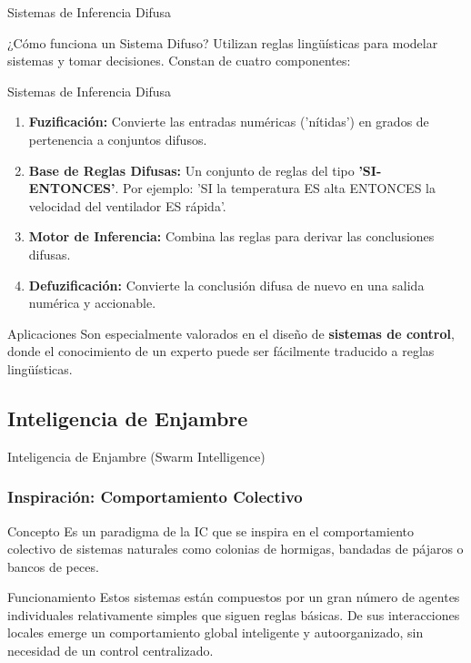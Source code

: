 \documentclass[aspectratio=169,xcolor=dvipsnames]{beamer}
\begin{document}
\begin{frame}{Sistemas de Inferencia Difusa}
    \begin{block}{¿Cómo funciona un Sistema Difuso?}
    Utilizan reglas lingüísticas para modelar sistemas y tomar decisiones. Constan de cuatro componentes:
    \end{block}
\end{frame}
\begin{frame}{Sistemas de Inferencia Difusa}
    \begin{enumerate}
        \item \textbf{Fuzificación:} Convierte las entradas numéricas ('nítidas') en grados de pertenencia a conjuntos difusos. \pause
        \item \textbf{Base de Reglas Difusas:} Un conjunto de reglas del tipo \textbf{'SI-ENTONCES'}. Por ejemplo: 'SI la temperatura ES alta ENTONCES la velocidad del ventilador ES rápida'. \pause
        \item \textbf{Motor de Inferencia:} Combina las reglas para derivar las conclusiones difusas. \pause
        \item \textbf{Defuzificación:} Convierte la conclusión difusa de nuevo en una salida numérica y accionable.
    \end{enumerate}
    
    \begin{alertblock}{Aplicaciones}
    Son especialmente valorados en el diseño de \textbf{sistemas de control}, donde el conocimiento de un experto puede ser fácilmente traducido a reglas lingüísticas.
    \end{alertblock}
\end{frame}

\subsection{Inteligencia de Enjambre}

\begin{frame}{Inteligencia de Enjambre (Swarm Intelligence)}
    \frametitle{Inspiración: Comportamiento Colectivo}
    \begin{block}{Concepto}
    Es un paradigma de la IC que se inspira en el comportamiento colectivo de sistemas naturales como colonias de hormigas, bandadas de pájaros o bancos de peces.
    \end{block}
    
    \begin{alertblock}{Funcionamiento}
    Estos sistemas están compuestos por un gran número de agentes individuales relativamente simples que siguen reglas básicas. De sus interacciones locales emerge un comportamiento global inteligente y autoorganizado, sin necesidad de un control centralizado.
    \end{alertblock}
\end{frame}
\end{document}
